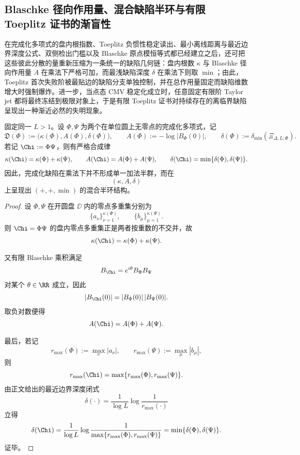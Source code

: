 \subsection{Blaschke 径向作用量、混合缺陷半环与有限 Toeplitz 证书的渐盲性}\label{subsec:conclusion-blaschke-radial-action-toeplitz-cmv-blindness}
在完成化多项式的盘内根指数、Toeplitz 负惯性稳定读出、最小离线距离与最近边界深度公式、双侧检出门槛以及 Blaschke 原点模恒等式都已经建立之后，还可把这些彼此分散的量重新压缩为一条统一的缺陷几何链：盘内根数 \(\kappa\) 与 Blaschke 径向作用量 \(A\) 在乘法下严格可加，而最浅缺陷深度 \(\delta\) 在乘法下则取 \(\min\)；由此，Toeplitz 首次失败阶被最贴边的缺陷分支单独控制，并在总作用量固定而缺陷维数增大时强制爆炸。进一步，当点态 CMV 稳定化成立时，任意固定有限阶 Taylor jet 都将最终冻结到极限对象上，于是有限 Toeplitz 证书对持续存在的离临界缺陷呈现出一种渐近必然的失明现象。

\begin{theorem}\label{thm:conclusion-completed-defect-mixed-semiring}
固定同一 \(L>1\)。设 \(\Phi,\Psi\) 为两个在单位圆上无零点的完成化多项式，记
\[
\mathfrak D(\Phi):=
\bigl(\kappa(\Phi),A(\Phi),\delta(\Phi)\bigr),
\qquad
A(\Phi):=-\log|B_\Phi(0)|,
\qquad
\delta(\Phi):=\delta_{\min}(\Xi_{\Delta,L;\Phi}).
\]
若记 \(\Chi:=\Phi\Psi\)，则有严格合成律
\[
\kappa(\Chi)=\kappa(\Phi)+\kappa(\Psi),
\qquad
A(\Chi)=A(\Phi)+A(\Psi),
\qquad
\delta(\Chi)=\min\{\delta(\Phi),\delta(\Psi)\}.
\]
因此，完成化缺陷在乘法下并不形成单一加法半群，而在
\[
(\kappa,A,\delta)
\]
上呈现出 \((+,+,\min)\) 的混合半环结构。
\end{theorem}
\begin{proof}
设 \(\Phi,\Psi\) 在开圆盘 \(\DD\) 内的零点多重集分别为
\[
\{a_\nu\}_{\nu=1}^{\kappa(\Phi)},
\qquad
\{b_\mu\}_{\mu=1}^{\kappa(\Psi)}.
\]
则 \(\Chi=\Phi\Psi\) 的盘内零点多重集正是两者按重数的不交并，故
\[
\kappa(\Chi)=\kappa(\Phi)+\kappa(\Psi).
\]

又有限 Blaschke 乘积满足
\[
B_\Chi=e^{i\theta}B_\Phi B_\Psi
\]
对某个 \(\theta\in\RR\) 成立，因此
\[
|B_\Chi(0)|=|B_\Phi(0)|\,|B_\Psi(0)|.
\]
取负对数便得
\[
A(\Chi)=A(\Phi)+A(\Psi).
\]

最后，若记
\[
r_{\max}(\Phi):=\max_\nu |a_\nu|,
\qquad
r_{\max}(\Psi):=\max_\mu |b_\mu|,
\]
则
\[
r_{\max}(\Chi)=\max\{r_{\max}(\Phi),r_{\max}(\Psi)\}.
\]
由正文给出的最近边界深度闭式
\[
\delta(\cdot)=\frac{1}{\log L}\log\frac{1}{r_{\max}(\cdot)}
\]
立得
\[
\delta(\Chi)
=
\frac{1}{\log L}\log\frac{1}{\max\{r_{\max}(\Phi),r_{\max}(\Psi)\}}
=
\min\{\delta(\Phi),\delta(\Psi)\}.
\]
证毕。
\end{proof}

